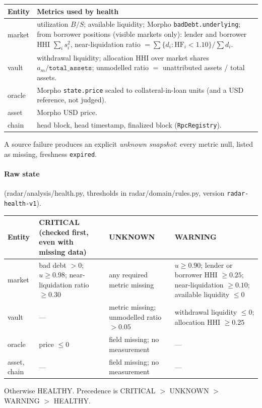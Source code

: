 \documentclass[11pt,a4paper]{article}
\newcommand{\code}[1]{\texttt{#1}}
\newcommand{\src}[1]{\textsf{\small #1}}
\begin{document}
\begin{center}\small
\begin{tabularx}{\textwidth}{@{}L{1.6cm}Y@{}}
\toprule
Entity & Metrics used by health \\
\midrule
market & utilization $B/S$; available liquidity; Morpho \code{badDebt.underlying}; from borrower positions (visible markets only): lender and borrower HHI $\sum_i s_i^2$, near-liquidation ratio $=\sum\{d_i:\text{HF}_i<1.10\}/\sum d_i$. \\
vault & withdrawal liquidity; allocation HHI over market shares $a_m/\code{total\_assets}$; unmodelled ratio $=$ unattributed assets / total assets. \\
oracle & Morpho \code{state.price} scaled to collateral-in-loan units (and a USD reference, not judged). \\
asset & Morpho USD price. \\
chain & head block, head timestamp, finalized block (\code{RpcRegistry}). \\
\bottomrule
\end{tabularx}
\end{center}
A source failure produces an explicit \emph{unknown snapshot}: every metric null,
listed as missing, freshness \code{expired}.

\paragraph{Raw state} (\src{radar/analysis/health.py}, thresholds in
\src{radar/domain/rules.py}, version \code{radar-health-v1}).
\begin{center}\small
\begin{tabularx}{\textwidth}{@{}L{1.4cm}L{4.4cm}L{2.6cm}Y@{}}
\toprule
Entity & CRITICAL (checked first, even with missing data) & UNKNOWN & WARNING \\
\midrule
market & bad debt $>0$; $u\geq0.98$; near-liquidation ratio $\geq0.30$ & any required metric missing & $u\geq0.90$; lender or borrower HHI $\geq0.25$; near-liquidation $\geq0.10$; available liquidity $\leq0$ \\
vault & --- & metric missing; unmodelled ratio $>0.05$ & withdrawal liquidity $\leq0$; allocation HHI $\geq0.25$ \\
oracle & price $\leq0$ & field missing; no measurement & --- \\
asset, chain & --- & field missing; no measurement & --- \\
\bottomrule
\end{tabularx}
\end{center}
Otherwise HEALTHY. Precedence is CRITICAL $>$ UNKNOWN $>$ WARNING $>$ HEALTHY.
\end{document}
